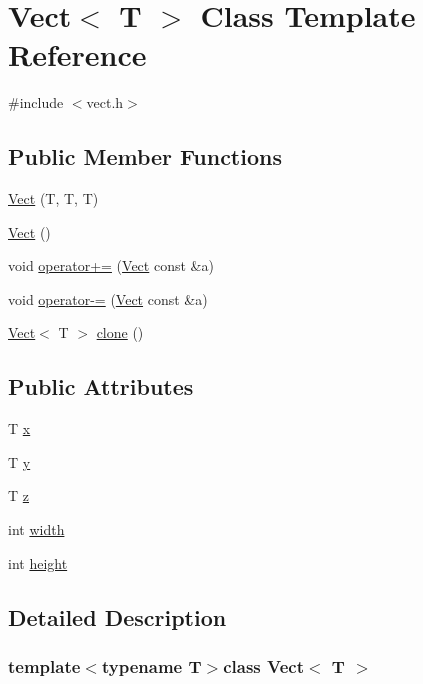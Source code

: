 \hypertarget{class_vect}{\section{Vect$<$ T $>$ Class Template Reference}
\label{class_vect}
}


{\ttfamily \#include $<$vect.\+h$>$}

\subsection*{Public Member Functions}
\begin{DoxyCompactItemize}
\item 
\hyperlink{class_vect_ae1dca6303ab9e40ea97dff23fd65ec6d}{Vect} (T, T, T)
\item 
\hyperlink{class_vect_a6363ccdaf64ac6dc3455eed6d36da8d0}{Vect} ()
\item 
void \hyperlink{class_vect_a920d663589950886a58fb7c0a0e029de}{operator+=} (\hyperlink{class_vect}{Vect} const \&a)
\item 
void \hyperlink{class_vect_a51a0b3e21a222fb4984cc40543d2a383}{operator-\/=} (\hyperlink{class_vect}{Vect} const \&a)
\item 
\hyperlink{class_vect}{Vect}$<$ T $>$ \hyperlink{class_vect_a0c7b512f9112b96370d10c190491a27f}{clone} ()
\end{DoxyCompactItemize}
\subsection*{Public Attributes}
\begin{DoxyCompactItemize}
\item 
T \hyperlink{class_vect_aaae8e033fd8c09bc939e1b2d112cd08a}{x}
\item 
T \hyperlink{class_vect_ae473746fe9f1385d10e6ae33d3c23b33}{y}
\item 
T \hyperlink{class_vect_a4671ff0667271bb36b96798fadba9e08}{z}
\item 
int \hyperlink{class_vect_afb888639716c23ebbe6766d2c6caa673}{width}
\item 
int \hyperlink{class_vect_abbaf6a1017c2a6e00cfb2c25dc403f22}{height}
\end{DoxyCompactItemize}


\subsection{Detailed Description}
\subsubsection*{template$<$typename T$>$class Vect$<$ T $>$}



